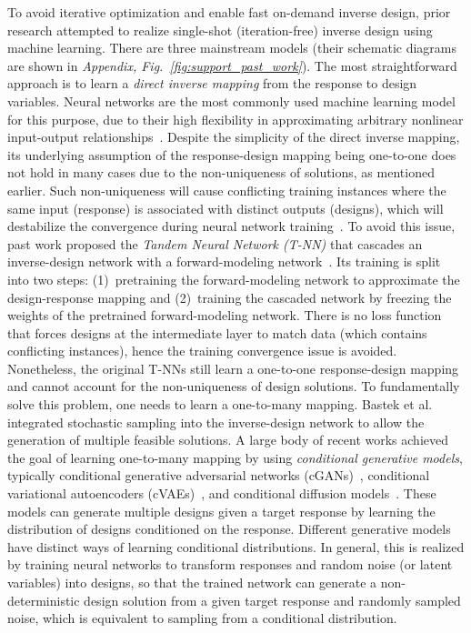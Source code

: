 \documentclass{article}
\begin{document}
To avoid iterative optimization and enable fast on-demand inverse design, prior research attempted to realize single-shot (iteration-free) inverse design using machine learning. There are three mainstream models (their schematic diagrams are shown in \textit{Appendix, Fig.~\ref{fig:support_past_work}}). The most straightforward approach is to learn a \textit{direct inverse mapping} from the response to design variables. Neural networks are the most commonly used machine learning model for this purpose, due to their high flexibility in approximating arbitrary nonlinear input-output relationships~\cite{Malkiel2018PlasmonicLearning,li2020designing}. Despite the simplicity of the direct inverse mapping, its underlying assumption of the response-design mapping being one-to-one does not hold in many cases due to the non-uniqueness of solutions, as mentioned earlier. Such non-uniqueness will cause conflicting training instances where the same input (response) is associated with distinct outputs (designs), which will destabilize the convergence during neural network training~\cite{liu2018training,lee2023data}. To avoid this issue, past work proposed the \textit{Tandem Neural Network (T-NN)} that cascades an inverse-design network with a forward-modeling network~\cite{liu2018training,an2019deep,kumar2020inverse,Yeung2021MultiplexedNetworks,bastek2022inverting}. Its training is split into two steps: (1)~pretraining the forward-modeling network to approximate the design-response mapping and (2)~training the cascaded network by freezing the weights of the pretrained forward-modeling network. There is no loss function that forces designs at the intermediate layer to match data (which contains conflicting instances), hence the training convergence issue is avoided. Nonetheless, the original T-NNs still learn a one-to-one response-design mapping and cannot account for the non-uniqueness of design solutions. To fundamentally solve this problem, one needs to learn a one-to-many mapping. Bastek et al.~\cite{bastek2022inverting} integrated stochastic sampling into the inverse-design network to allow the generation of multiple feasible solutions. A large body of recent works achieved the goal of learning one-to-many mapping by using \textit{conditional generative models}, typically conditional generative adversarial networks (cGANs)~\cite{jiang2019free,so2019designing,wen2020robust,gurbuz2021generative,An2021MultifunctionalNetwork}, conditional variational autoencoders (cVAEs)~\cite{ma2019probabilistic}, and conditional diffusion models~\cite{lew2023single}. These models can generate multiple designs given a target response by learning the distribution of designs conditioned on the response. Different generative models have distinct ways of learning conditional distributions. In general, this is realized by training neural networks to transform responses and random noise (or latent variables) into designs, so that the trained network can generate a non-deterministic design solution from a given target response and randomly sampled noise, which is equivalent to sampling from a conditional distribution.
\end{document}

